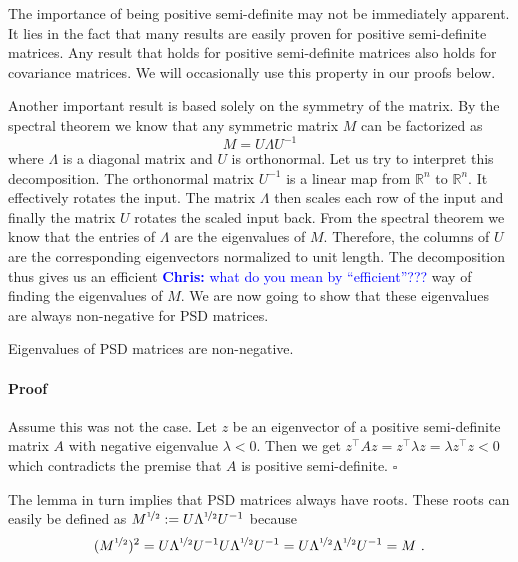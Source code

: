 \documentclass[a4paper,11pt,leqno]{report}\usepackage[]{graphicx}\usepackage[]{color}
\newcommand{\chris}[1]{ \textcolor{blue}{\textbf{Chris:} #1}}
\begin{document}
The importance of being positive semi-definite may not be immediately apparent. It lies in the fact that many results are easily proven for positive semi-definite 
matrices. Any result that holds for positive semi-definite matrices also holds for covariance matrices. We will occasionally use this property in our proofs below.

Another important result is based solely on the symmetry of the matrix. By the spectral theorem we know that any symmetric matrix $ M $ can be factorized as
\begin{equation}\label{eq:eigenvalueDecomp}
M = U \Lambda U^{-1}
\end{equation}
where $ \Lambda $ is a diagonal matrix and $ U $ is orthonormal. Let us try to interpret this decomposition. The orthonormal matrix $ U^{-1} $ is a linear map from
$ \mathbb{R}^{n} $ to $ \mathbb{R}^{n} $. It effectively rotates the input. The matrix $ \Lambda $ then scales each row of the input and finally the matrix
$ U $ rotates the scaled input back. From the spectral theorem we know that the entries of $ \Lambda $ are the eigenvalues of $ M $. Therefore, the columns of $ U $
are the corresponding eigenvectors normalized to unit length. The decomposition thus gives us an efficient \chris{what do you mean by ``efficient''???} way of finding the eigenvalues of $ M $. We are now going
to show that these eigenvalues are always non-negative for PSD matrices.

\begin{Lemma}
Eigenvalues of PSD matrices are non-negative.
\end{Lemma}
\paragraph{Proof}  Assume this was not the case. Let $ z $ be an eigenvector of a positive 
semi-definite matrix $ A $ with negative eigenvalue $ \lambda < 0$. Then we get $ z^{\top}Az = z^{\top}\lambda z = \lambda z^{\top} z < 0 $ which contradicts the
premise that $ A $ is positive semi-definite. $ \square $

The lemma in turn implies that PSD matrices always have roots. These roots can easily be defined as $M^{\nicefrac{1}{2}} := U \Lambda^{\nicefrac{1}{2}} U^{-1}$ because
\begin{equation}\label{eq:PSDRoots}
(M^{\nicefrac{1}{2}})^2 = U \Lambda^{\nicefrac{1}{2}}U^{-1} U \Lambda^{\nicefrac{1}{2}} U^{-1}  =  U\Lambda^{\nicefrac{1}{2}}\Lambda^{\nicefrac{1}{2}} U^{-1} = M\ .
\end{equation} 
\end{document}
